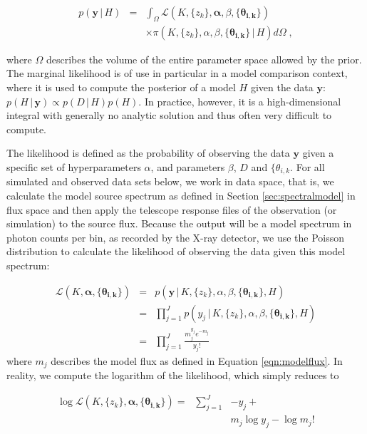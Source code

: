 \documentclass[12pt]{emulateapj}
\newcommand{\given}{\,|\,}
\newcommand{\counts}{y}
\newcommand{\pars}{\theta}
\newcommand{\mean}{m}
\newcommand{\likelihood}{{\mathcal L}}
\begin{document}
\begin{eqnarray}
p(\bm{\counts} \given H) & = & \int_\Omega{ \likelihood(K, \{z_k\}, \bm{\alpha}, \beta, \{\bm{\pars_{i,k}}\}) } \\\nonumber
					& &{ \times \pi(K, \{z_k\}, \alpha, \beta, \{\bm{\pars_{i,k}}\} \given H) d\Omega} \; ,
\end{eqnarray}

\noindent where $\Omega$ describes the volume of the entire parameter space allowed by the prior. The marginal likelihood is of use in particular in a model comparison context, where it is used to compute the posterior of a model $H$ given the data $\bm{\counts}$: $p(H \given \bm{\counts}) \propto p(D \given H) p(H)$. In practice, however, it is a high-dimensional integral with generally no analytic solution and thus often very difficult to compute.

The likelihood is defined as the probability of observing the data $\bm{\counts}$ given a specific set of hyperparameters $\alpha$, and parameters $\beta$, $D$ and $\{\pars_{i,k}$. For all simulated and observed data sets below, we work in data space, that is, we calculate the model source spectrum as defined in Section \ref{sec:spectralmodel} in flux space and then apply the telescope response files of the observation (or simulation) to the source flux. Because the output will be a model spectrum in photon counts per bin, as recorded by the X-ray detector, we use the Poisson distribution to calculate the likelihood of observing the data given this model spectrum:

\begin{eqnarray}
\likelihood(K, \bm{\alpha}, \{\bm{\pars_{i,k}}\}) & = & p(\bm{\counts} \given K, \{z_k\}, \alpha, \beta, \{\bm{\pars_{i,k}}\}, H) \\ \nonumber
			& = & \prod_{j=1}^{J}{p(\counts_j \given K, \{z_k\}, \alpha, \beta, \{\bm{\pars_{i,k}}\}, H)} \\\nonumber
			& = &  \prod_{j=1}^{J} \frac{ \mean_j^{\counts_j} e^{-\mean_j}}{\counts_j !} 
\end{eqnarray}	
\noindent where $\mean_j$ describes the model flux as defined in Equation \ref{eqn:modelflux}. In reality, we compute the logarithm of the likelihood, which simply reduces to

\begin{eqnarray}
\log{\likelihood(K, \{z_k\}, \bm{\alpha}, \{\bm{\pars_{i,k}}\})} = & \sum_{j=1}^{J} & -\counts_j + \\ \nonumber 
					    & & \mean_j \log{\counts_j} - \log{\mean_j !} %
\end{eqnarray}
\end{document}
